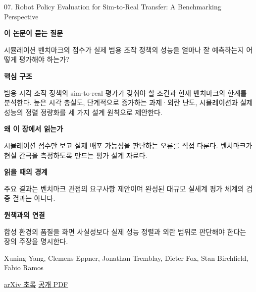 \documentclass[11pt,openany]{book}
\begin{document}
\begin{termcard}{07. Robot Policy Evaluation for Sim-to-Real Transfer: A Benchmarking Perspective}

\par

\medskip

{\sffamily\bfseries\color{deepblue} 이 논문이 묻는 질문}\par

시뮬레이션 벤치마크의 점수가 실제 범용 조작 정책의 성능을 얼마나 잘 예측하는지 어떻게 평가해야 하는가?

\smallskip

{\sffamily\bfseries\color{deepblue} 핵심 구조}\par

범용 시각 조작 정책의 sim-to-real 평가가 갖춰야 할 조건과 현재 벤치마크의 한계를 분석한다. 높은 시각 충실도, 단계적으로 증가하는 과제·외란 난도, 시뮬레이션과 실제 성능의 정렬 정량화를 세 가지 설계 원칙으로 제안한다.

\smallskip

{\sffamily\bfseries\color{deepblue} 왜 이 장에서 읽는가}\par

시뮬레이션 점수만 보고 실제 배포 가능성을 판단하는 오류를 직접 다룬다. 벤치마크가 현실 간극을 측정하도록 만드는 평가 설계 자료다.

\smallskip

{\sffamily\bfseries\color{coral} 읽을 때의 경계}\par

주요 결과는 벤치마크 관점의 요구사항 제안이며 완성된 대규모 실세계 평가 체계의 검증 결과는 아니다.

\smallskip

{\sffamily\bfseries\color{teal} 원책과의 연결}\par

합성 환경의 품질을 화면 사실성보다 실제 성능 정렬과 외란 범위로 판단해야 한다는 장의 주장을 명시한다.

\medskip

{\footnotesize\color{muted} Xuning Yang, Clemens Eppner, Jonathan Tremblay, Dieter Fox, Stan Birchfield, Fabio Ramos\par

\href{https://arxiv.org/abs/2508.11117}{arXiv 초록} \quad \href{https://arxiv.org/pdf/2508.11117}{공개 PDF}\par}

\end{termcard}
\end{document}
